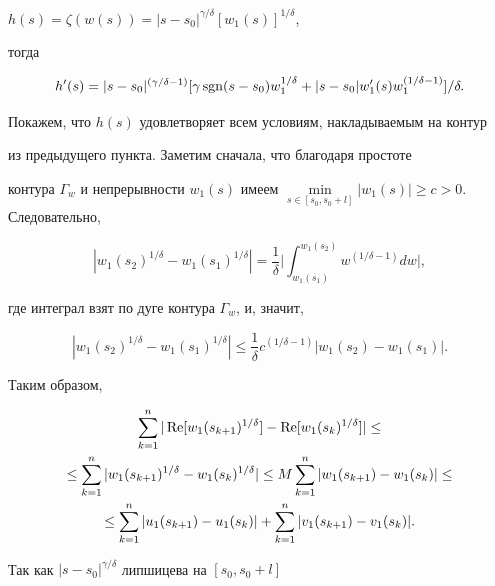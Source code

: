 $h(s)=\zeta(w(s)) = |s-s_0|^{{\gamma}/{\delta}}[w_1(s)]^


{{1}/{\delta}}$,


тогда


$$


h'(s) = |s-s_0|^{(\gamma/\delta - 1)}[\gamma \sgn(s-


s_0)w_1^{1/\delta} + |s-s_0|w_1'(s) w_1^{(1/\delta - 1)}]/\delta.


$$


Покажем, что $h(s)$ удовлетворяет всем условиям, накладываемым на контур


из предыдущего пункта. Заметим сначала, что благодаря простоте


контура $\Gamma_w$ и непрерывности $w_1(s)$ имеем $\min\limits_{s \in


[s_0,s_0 + l]} |w_1(s)| \geq c > 0.$ Следовательно,


$$


|w_1(s_2)^{1/\delta} - w_1(s_1)^{1/\delta}| = \frac{1}{\delta}


\bigg|\int_{w_1(s_1)}^{w_1(s_2)}w^{(1/\delta - 1)} dw\bigg|,


$$


где интеграл взят по дуге контура $\Gamma_w$, и, значит,


$$


|w_1(s_2)^{1/\delta} - w_1(s_1)^{1/\delta}| \leq \frac{1}{\delta}


c^{(1/\delta - 1)} |w_1(s_2) - w_1(s_1)|.


$$


Таким образом,


\begin{multline*}


\sum_{k=1}^n |\re[w_1(s_{k+1})^{1/\delta}] -


\re[w_1(s_k)^{1/\delta}]| \leq \\


%


\leq \sum_{k=1}^n |w_1(s_{k+1})^{1/\delta} - w_1(s_k)^{1/\delta}|


\leq M \sum_{k=1}^n |w_1(s_{k+1}) - w_1(s_k)|\leq \\


%


\leq \sum_{k=1}^n


|u_1(s_{k+1}) - u_1(s_k)| + \sum_{k=1}^n |v_1(s_{k+1}) - v_1(s_k)|.


\end{multline*}


Так как $|s-s_0|^{\gamma/\delta}$ липшицева на $[s_0,s_0 + l]$


